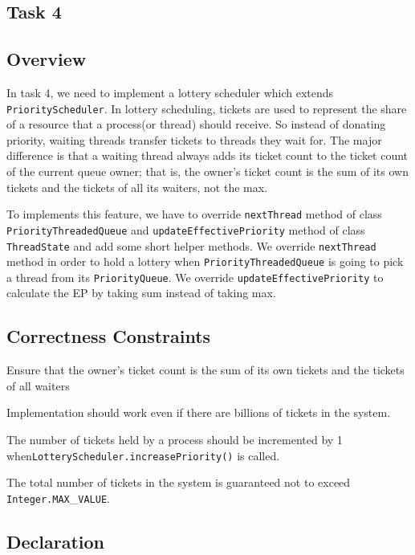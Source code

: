 \documentclass{article}
\begin{document}
\begin{spacing}{1.1}
\section{Task 4}

\subsection{Overview}
In task 4, we need to implement a lottery scheduler which extends \texttt{PriorityScheduler}. In lottery scheduling, tickets are used to represent the share of a resource that a process(or thread) should receive. So instead of donating priority, waiting threads transfer tickets to threads they wait for. The major difference is that a waiting thread always adds its ticket count to the ticket count of the current queue owner; that is, the owner's ticket count is the sum of its own tickets and the tickets of all its waiters, not the max.

To implements this feature, we have to override \texttt{nextThread} method of class \texttt{PriorityThreadedQueue} and \texttt{updateEffectivePriority} method of class \texttt{ThreadState} and add some short helper methods. We override \texttt{nextThread} method in order to hold a lottery when \texttt{PriorityThreadedQueue} is going to pick a thread from its \texttt{PriorityQueue}. We override \texttt{updateEffectivePriority} to calculate the EP by taking sum instead of taking max.

\subsection{Correctness Constraints}

\begin{asparaitem}
\item Ensure that the owner's ticket count is the sum of its own tickets and the tickets of all waiters
\item Implementation should work even if there are billions of tickets in the system.
\item The number of tickets held by a process should be incremented by 1 when\linebreak \texttt{LotteryScheduler.increasePriority()} is called.
\item The total number of tickets in the system is guaranteed not to exceed \texttt{Integer.MAX}\_\texttt{VALUE}.
\end{asparaitem}

\subsection{Declaration}


\end{spacing}
\end{document}

